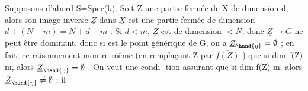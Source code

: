 Supposons d'abord S=Spec(k). Soit Z une partie fermée de X de
dimension d, alors son image inverse $\underline{Z}$ dans $\underline{X}$ est une partie fermée de
dimension $d + (N-m) = N + d-m$ . Si $d < m$, $\underline{Z}$ est de dimension $< N$,
donc $\underline{Z} \longrightarrow G$ ne peut être dominant, donc si \hand{$\eta$} est le point générique de
G, on a $\underline{Z}_{\hand{\eta}} = \emptyset$ ; en fait, ce raisonnement montre même (en remplaçant
Z par $\overline{f(Z)}$ ) que si dim f(Z) \hand{$<$} m, alors $\underline{Z}_{\hand{\eta}} = \emptyset$ . On veut une condi-%
tion  assurant que si dim f(Z)  m, alors $\underline{Z}_{\hand{\eta}} \neq \emptyset$ ;  il

